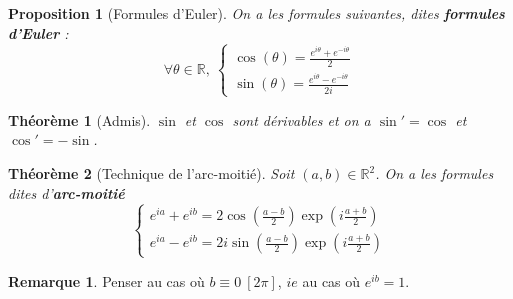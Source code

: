 \documentclass[french]{book}
\newcommand{\R}{\mathbb{R}}
\theoremstyle{plain}
\newtheorem{thm}{Théorème}[chapter]
\newtheorem{prop}{Proposition}[chapter]
\theoremstyle{definition}
\newtheorem{rmq}{Remarque}[chapter]
\theoremstyle{remark}
\begin{document}
\begin{prop}[Formules d'Euler]
	On a les formules suivantes, dites \textbf{formules d'Euler} :
	$$\forall\theta\in\R,\ \begin{cases}
		\displaystyle\cos(\theta)=\frac{e^{i\theta}+e^{-i\theta}}{2} \\
		\displaystyle\sin(\theta)=\frac{e^{i\theta}-e^{-i\theta}}{2i}
	\end{cases}$$
\end{prop}
\begin{thm}[Admis]
	$\sin$ et $\cos$ sont dérivables et on a $\sin'=\cos$ et $\cos'=-\sin$.
\end{thm}
\begin{thm}[Technique de l'arc-moitié]
	Soit $(a,b)\in\R^2$. On a les formules dites d'\textbf{arc-moitié} $$\begin{cases}
		e^{ia}+e^{ib}=\displaystyle 2\cos\left(\frac{a-b}{2}\right)\exp\left(i\frac{a+b}{2}\right)\\
		e^{ia}-e^{ib}=\displaystyle 2i\sin\left(\frac{a-b}{2}\right)\exp\left(i\frac{a+b}{2}\right)
	\end{cases}$$
\end{thm}
\begin{rmq}
	Penser au cas où $b\equiv0\ [2\pi]$, $ie$ au cas où $e^{ib}=1$.
\end{rmq}
\end{document}

